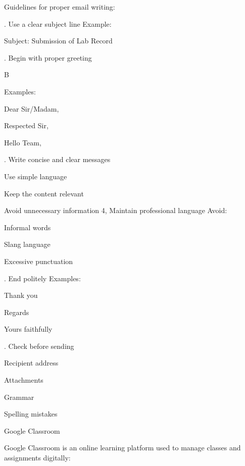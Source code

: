 \documentclass[10pt,a4paper]{article}
\begin{document}
\noindent Guidelines for proper email writing:\par
{}. Use a clear subject line Example:\par
\clearpage
\noindent Subject: Submission of Lab Record\par
{}. Begin with proper greeting\par
\noindent B\par

\noindent Examples:\par
\noindent\textbullet\; Dear Sir/Madam,\par
\noindent\textbullet\; Respected Sir,\par
\noindent\textbullet\; Hello Team,\par
{}. Write concise and clear messages\par
\noindent\textbullet\; Use simple language\par
\noindent\textbullet\; Keep the content relevant\par
\noindent\textbullet\; Avoid unnecessary information 4, Maintain professional language Avoid:\par
\noindent\textbullet\; Informal words\par
\noindent\textbullet\; Slang language\par
\noindent\textbullet\; Excessive punctuation\par
{}. End politely Examples:\par
\noindent\textbullet\; Thank you\par
\noindent\textbullet\; Regards\par
\noindent\textbullet\; Yours faithfully\par
{}. Check before sending\par
\noindent\textbullet\; Recipient address\par
\noindent\textbullet\; Attachments\par
\noindent\textbullet\; Grammar\par
\noindent\textbullet\; Spelling mistakes\par
\noindent Google Classroom\par
\noindent Google Classroom is an online learning platform used to manage classes and assignments digitally:\par
\end{document}

